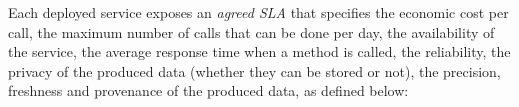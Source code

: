 
\begin{figure}
\end{figure}


Each deployed service exposes an \textit{agreed SLA} that specifies the economic cost per call, the maximum number of calls that can be done per day, the availability of the service, the average response time when a method is called, the reliability, the privacy of the produced data (whether they can be stored or not), the precision, freshness and provenance of the produced data, as defined below:

